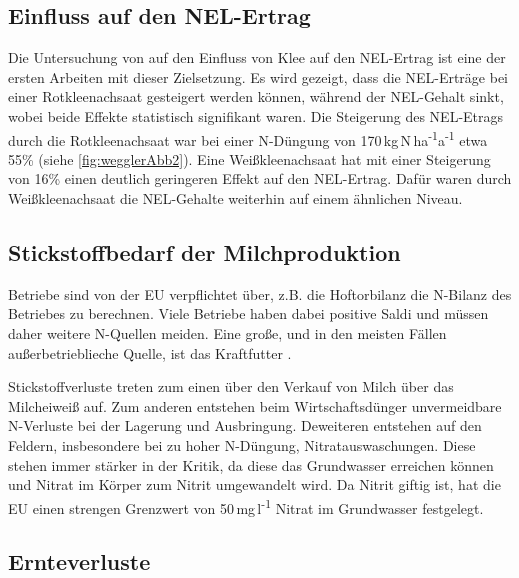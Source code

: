 \subsection{Einfluss auf den \acl{NEL}-Ertrag}
\label{subsec:NEL}
Die Untersuchung von \textcite{weggler2050leguminosen} auf den Einfluss von Klee auf den \ac{NEL}-Ertrag ist eine der ersten Arbeiten mit dieser Zielsetzung.
Es wird gezeigt, dass die \ac{NEL}-Erträge bei einer Rotkleenachsaat gesteigert werden können, während der \ac{NEL}-Gehalt sinkt, wobei beide Effekte statistisch signifikant waren.
Die Steigerung des \ac{NEL}-Etrags durch die Rotkleenachsaat war bei einer N-Düngung von 170\,kg\,N\,ha\textsuperscript{-1}a\textsuperscript{-1} etwa 55\% (siehe \cref{fig:wegglerAbb2}).
Eine Weißkleenachsaat hat mit einer Steigerung von 16\% einen deutlich geringeren Effekt auf den \ac{NEL}-Ertrag.
Dafür waren durch Weißkleenachsaat die \ac{NEL}-Gehalte weiterhin auf einem ähnlichen Niveau.


\subsection{Stickstoffbedarf der Milchproduktion}
\label{subsec:Stickstoff}
Betriebe sind von der \ac{EU} verpflichtet über, z.B. die Hoftorbilanz die N-Bilanz des Betriebes zu berechnen.
Viele Betriebe haben dabei positive Saldi \parencite[7ff]{lellmann2005untersuchungen} und müssen daher weitere N-Quellen meiden.
Eine große, und in den meisten Fällen außerbetrieblieche Quelle, ist das Kraftfutter \parencite[62]{lellmann2005untersuchungen}.

Stickstoffverluste treten zum einen über den Verkauf von Milch über das Milcheiweiß auf.
Zum anderen entstehen beim Wirtschaftsdünger unvermeidbare N-Verluste bei der Lagerung und Ausbringung.
Deweiteren entstehen auf den Feldern, insbesondere bei zu hoher N-Düngung, Nitratauswaschungen.
Diese stehen immer stärker in der Kritik, da diese das Grundwasser erreichen können und Nitrat im Körper zum Nitrit umgewandelt wird.
Da Nitrit giftig ist, hat die \ac{EU} einen strengen Grenzwert von 50\,mg\,l\textsuperscript{-1} Nitrat im Grundwasser festgelegt.

\subsection{Ernteverluste}
\label{subsec:Lit:Ernte}

